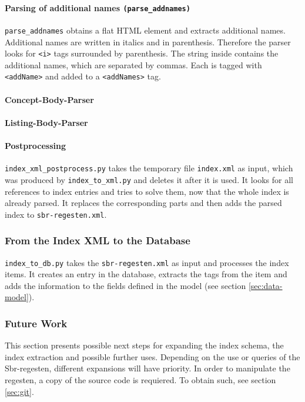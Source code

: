 \paragraph{Parsing of additional names \texttt{(parse\_addnames)}}
\label{sec:addNames}
\texttt{parse\_addnames} obtains a flat HTML element and extracts additional names. Additional names are written in italics and in parenthesis. Therefore the parser looks for \texttt{<i>} tags surrounded by parenthesis. The string inside contains the additional names, which are separated by commas. Each is tagged with \texttt{<addName>} and added to a \texttt{<addNames>} tag.

\paragraph{Concept-Body-Parser}

\paragraph{Listing-Body-Parser}


\paragraph{Postprocessing}
\label{sec:postproc}
\texttt{index\_xml\_postprocess.py} takes the temporary file \texttt{index.xml} as input, which was produced by \texttt{index\_to\_xml.py} and deletes it after it is used. It looks for all references to index entries and tries to solve them, now that the whole index is already parsed. It replaces the corresponding parts and then adds the parsed index to \texttt{sbr-regesten.xml}.

\subsubsection{From the Index XML to the Database}
\texttt{index\_to\_db.py} takes the \texttt{sbr-regesten.xml} as input and processes the index items. It creates an entry in the database, extracts the tags from the item and adds the information to the fields defined in the model (see section \ref{sec:data-model}).





\subsubsection{Future Work}

This section presents possible next steps for expanding the index schema, the index extraction and possible further uses. Depending on the use or queries of the Sbr-regesten, different expansions will have priority. In order to manipulate the regesten, a copy of the source code is requiered. To obtain such, see section \ref{sec:git}.
